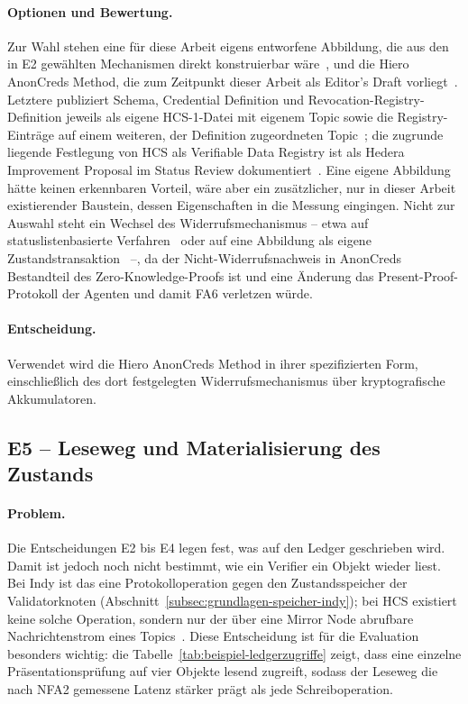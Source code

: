 \paragraph{Optionen und Bewertung.}
Zur Wahl stehen eine für diese Arbeit eigens entworfene Abbildung, die aus den in E2 gewählten Mechanismen direkt konstruierbar wäre~\cite{hcs1standard}, und die Hiero AnonCreds Method, die zum Zeitpunkt dieser Arbeit als Editor's Draft vorliegt~\cite{hieroanoncreds}. Letztere publiziert Schema, Credential Definition und Revocation-Registry-Definition jeweils als eigene HCS-1-Datei mit eigenem Topic sowie die Registry-Einträge auf einem weiteren, der Definition zugeordneten Topic~\cite{hieroanoncreds}; die zugrunde liegende Festlegung von HCS als Verifiable Data Registry ist als Hedera Improvement Proposal im Status Review dokumentiert~\cite{hip762}. Eine eigene Abbildung hätte keinen erkennbaren Vorteil, wäre aber ein zusätzlicher, nur in dieser Arbeit existierender Baustein, dessen Eigenschaften in die Messung eingingen. Nicht zur Auswahl steht ein Wechsel des Widerrufsmechanismus -- etwa auf statuslistenbasierte Verfahren~\cite{bitstringstatuslist} oder auf eine Abbildung als eigene Zustandstransaktion~\cite{mamoru2026} --, da der Nicht-Widerrufsnachweis in AnonCreds Bestandteil des Zero-Knowledge-Proofs ist und eine Änderung das Present-Proof-Protokoll der Agenten und damit FA6 verletzen würde.

\paragraph{Entscheidung.}
Verwendet wird die Hiero AnonCreds Method in ihrer spezifizierten Form, einschließlich des dort festgelegten Widerrufsmechanismus über kryptografische Akkumulatoren.

\subsection{E5 -- Leseweg und Materialisierung des Zustands}
\label{subsec:e5-leseweg}

\paragraph{Problem.}
Die Entscheidungen E2 bis E4 legen fest, was auf den Ledger geschrieben wird. Damit ist jedoch noch nicht bestimmt, wie ein Verifier ein Objekt wieder liest. Bei Indy ist das eine Protokolloperation gegen den Zustandsspeicher der Validatorknoten (Abschnitt~\ref{subsec:grundlagen-speicher-indy}); bei HCS existiert keine solche Operation, sondern nur der über eine Mirror Node abrufbare Nachrichtenstrom eines Topics~\cite{bairdgross2019}. Diese Entscheidung ist für die Evaluation besonders wichtig: die Tabelle~\ref{tab:beispiel-ledgerzugriffe} zeigt, dass eine einzelne Präsentationsprüfung auf vier Objekte lesend zugreift, sodass der Leseweg die nach NFA2 gemessene Latenz stärker prägt als jede Schreiboperation.

